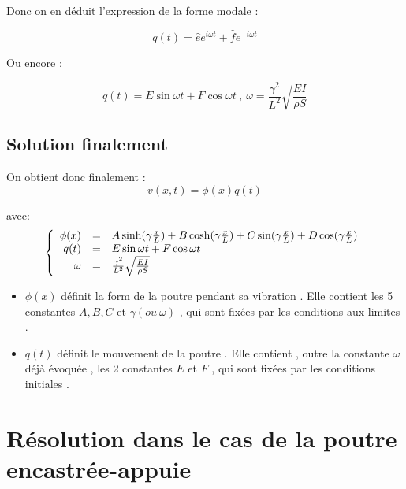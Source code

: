\documentclass[a4paper,10pt]{report} %
\begin{document}
Donc on en déduit l'expression de la forme modale :

\begin{equation}
    q(t)=\hat{e}e^{i\omega t}+\hat{f}e^{-i\omega t}
    \label{equation12}
\end{equation}

Ou encore :

\begin{equation}
    q(t)=E\sin{\omega t}+F\cos{\omega t}\ , \ \omega=\frac{\gamma^2}{L^2}\sqrt{\frac{EI}{\rho S}}
    \label{equation13}
\end{equation}


\section{Solution finalement}
On obtient donc finalement :
\begin{equation}
	v(x,t)=\phi (x)q(t)
	\label{equation15}
\end{equation}

avec:
\begin{equation}
    \left\{
    \begin{array}{r c l}
        \phi(x)&=&A\sinh(\gamma\frac{x}{L})+B\cosh(\gamma\frac{x}{L})+C\sin(\gamma\frac{x}{L})+D\cos(\gamma\frac{x}{L})\\q(t)&=&E\sin{\omega t}+F\cos{\omega t}\\
        \omega&=&\frac{\gamma^2}{L^2}\sqrt{\frac{EI}{\rho S}}
    \end{array}
    \right.
\end{equation}

\begin{itemize}
    \item $\phi (x)$  définit la form de la poutre pendant sa vibration . Elle contient les 5 constantes $A, B, C$ et $\gamma (ou\ \omega)$ , qui sont fixées par les conditions aux limites .
    
    \item $q(t)$ définit le mouvement de la poutre . Elle contient , outre la constante $\omega$ déjà évoquée , les 2 constantes $E$ et $F$ , qui sont fixées par les conditions initiales .
\end{itemize}



\chapter{Résolution dans le cas de la poutre encastrée-appuie} %
\end{document}
